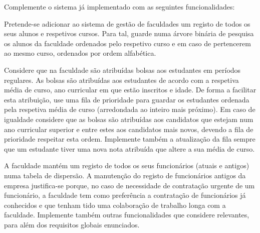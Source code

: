 Complemente o sistema já implementado com as seguintes funcionalidades\+:
\begin{DoxyItemize}
\item Pretende-\/se adicionar ao sistema de gestão de faculdades um registo de todos os seus alunos e respetivos cursos. Para tal, guarde numa árvore binária de pesquisa os alunos da faculdade ordenados pelo respetivo curso e em caso de pertencerem ao mesmo curso, ordenados por ordem alfabética.
\item Considere que na faculdade são atribuídas bolsas aos estudantes em períodos regulares. As bolsas são atribuídas aos estudantes de acordo com a respetiva média de curso, ano curricular em que estão inscritos e idade. De forma a facilitar esta atribuição, use uma fila de prioridade para guardar os estudantes ordenada pela respetiva média de curso (arredondada ao inteiro mais próximo). Em caso de igualdade considere que as bolsas são atribuídas aos candidatos que estejam num ano curricular superior e entre estes aos candidatos mais novos, devendo a fila de prioridade respeitar esta ordem. Implemente também a atualização da fila sempre que um estudante tiver uma nova nota atribuída que altere a sua média de curso.
\item A faculdade mantém um registo de todos os seus funcionários (atuais e antigos) numa tabela de dispersão. A manutenção do registo de funcionários antigos da empresa justifica-\/se porque, no caso de necessidade de contratação urgente de um funcionário, a faculdade tem como preferência a contratação de funcionários já conhecidos e que tenham tido uma colaboração de trabalho longa com a faculdade. Implemente também outras funcionalidades que considere relevantes, para além dos requisitos globais enunciados. 
\end{DoxyItemize}